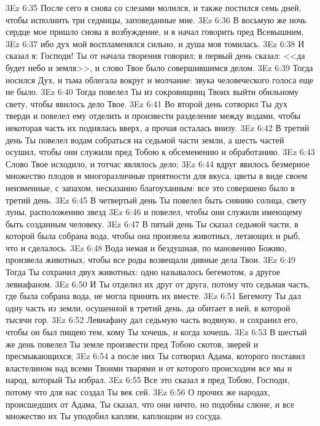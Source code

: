 \rsbpar\vs 3Ez 6:35 После сего я снова со слезами молился, и также постился семь дней, чтобы исполнить три седмицы, заповеданные мне.
\vs 3Ez 6:36 В восьмую же ночь сердце мое пришло снова в возбуждение, и я начал говорить пред Всевышним,
\vs 3Ez 6:37 ибо дух мой воспламенялся сильно, и душа моя томилась.
\vs 3Ez 6:38 И сказал я: Господи! Ты от начала творения говорил; в первый день сказал: <<да будет небо и земля>>, и слово Твое было совершившимся делом.
\vs 3Ez 6:39 Тогда носился Дух, и тьма облегала вокруг и молчание: звука человеческого голоса еще не было.
\vs 3Ez 6:40 Тогда повелел Ты из сокровищниц Твоих выйти обильному свету, чтобы явилось дело Твое.
\vs 3Ez 6:41 Во второй день сотворил Ты дух тверди и повелел ему отделить и произвести разделение между водами, чтобы некоторая часть их поднялась вверх, а прочая осталась внизу.
\vs 3Ez 6:42 В третий день Ты повелел водам собраться на седьмой части земли, а шесть частей осушил, чтобы они служили пред Тобою к обсеменению и обработанию.
\vs 3Ez 6:43 Слово Твое исходило, и тотчас являлось дело;
\vs 3Ez 6:44 вдруг явилось безмерное множество плодов и многоразличные приятности для вкуса, цветы в виде своем неизменные, с запахом, несказанно благоуханным: все это совершено было в третий день.
\vs 3Ez 6:45 В четвертый день Ты повелел быть сиянию солнца, свету луны, расположению звезд
\vs 3Ez 6:46 и повелел, чтобы они служили имеющему быть созданным человеку.
\vs 3Ez 6:47 В пятый день Ты сказал седьмой части, в которой была собрана вода, чтобы она произвела животных, летающих и рыб, что и сделалось.
\vs 3Ez 6:48 Вода немая и бездушная, по мановению Божию, произвела животных, чтобы все роды возвещали дивные дела Твои.
\vs 3Ez 6:49 Тогда Ты сохранил двух животных: одно называлось бегемотом, а другое левиафаном.
\vs 3Ez 6:50 И Ты отделил их друг от друга, потому что седьмая часть, где была собрана вода, не могла принять их вместе.
\vs 3Ez 6:51 Бегемоту Ты дал одну часть из земли, осушенной в третий день, да обитает в ней, в которой тысячи гор.
\vs 3Ez 6:52 Левиафану дал седьмую часть водяную, и сохранил его, чтобы он был пищею тем, кому Ты хочешь, и когда хочешь.
\vs 3Ez 6:53 В шестый же день повелел Ты земле произвести пред Тобою скотов, зверей и пресмыкающихся;
\vs 3Ez 6:54 а после них Ты сотворил Адама, которого поставил властелином над всеми Твоими тварями и от которого происходим все мы и народ, который Ты избрал.
\vs 3Ez 6:55 Все это сказал я пред Тобою, Господи, потому что для нас создал Ты век сей.
\vs 3Ez 6:56 О прочих же народах, происшедших от Адама, Ты сказал, что они ничто, но подобны слюне, и все множество их Ты уподобил каплям, каплющим из сосуда.
